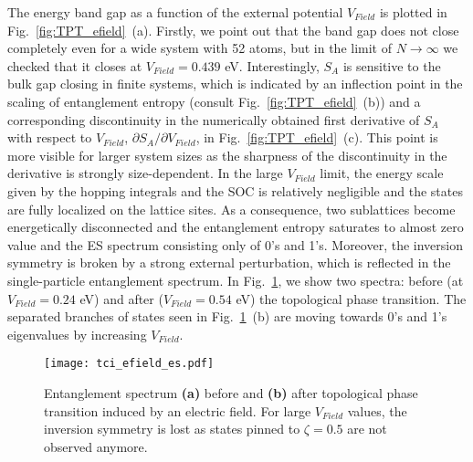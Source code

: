 The energy band gap as a function of the external potential $V_{Field}$ is plotted in Fig.~\ref{fig:TPT_efield}~(a). Firstly, we point out that the band gap does not close completely even for a wide system with 52 atoms, but in the limit of $N \rightarrow \infty$ we checked that it closes at $V_{Field} = 0.439$ eV. Interestingly, $S_A$ is sensitive to the bulk gap closing in finite systems, which is indicated by an inflection point in the scaling of entanglement entropy (consult Fig.~\ref{fig:TPT_efield}~(b)) and a corresponding discontinuity in the numerically obtained first derivative of $S_A$ with respect to $V_{Field}$, $\partial S_A / \partial V_{Field}$, in Fig.~\ref{fig:TPT_efield}~(c). This point is more visible for larger system sizes as the sharpness of the discontinuity  in the derivative is strongly size-dependent. In the large $V_{Field}$ limit, the energy scale given by the hopping integrals and the SOC is relatively negligible and the states are fully localized on the lattice sites. As a consequence, two sublattices become energetically disconnected and the entanglement entropy saturates to almost zero value and the ES spectrum consisting only of 0's and 1's. Moreover, the inversion symmetry is broken by a strong external perturbation, which is reflected in the single-particle entanglement spectrum. In Fig.~\ref{fig:ES_efield}, we show two spectra: before (at $V_{Field} = 0.24$ eV) and after ($V_{Field} = 0.54$ eV) the topological phase transition. The separated branches of states seen in Fig.~\ref{fig:ES_efield}~(b) are moving towards 0's and 1's eigenvalues by increasing $V_{Field}$. 

\begin{figure}[H]
\centering
\texttt{[image: tci\_efield\_es.pdf]}
\caption[Entanglement spectrum in a presence of electric field]{Entanglement spectrum \textbf{(a)} before and \textbf{(b)} after topological phase transition induced by an electric field. For large $V_{Field}$ values, the inversion symmetry is lost as states pinned to $\zeta = 0.5$ are not observed anymore.}
\label{fig:ES_efield}
\end{figure}


